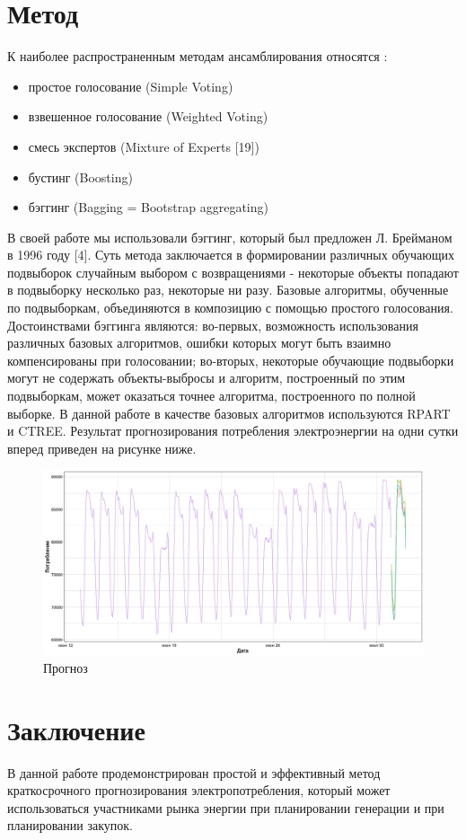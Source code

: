 \documentclass[60x84/16,8pt]{ittmm}
\begin{document}
\section{Метод}
\label{sec:methods}
К наиболее распространенным методам ансамблирования относятся \cite{Tihonov2006}:
\begin{itemize}
    \item простое голосование (Simple Voting)
    \item взвешенное голосование (Weighted Voting)
    \item смесь экспертов (Mixture of Experts [19])
    \item бустинг (Boosting)
    \item бэггинг (Bagging = Bootstrap aggregating)
\end{itemize}
В своей работе мы использовали бэггинг, который был предложен Л. Брейманом в
1996 году [4]. Суть метода заключается в формировании различных обучающих
подвыборок случайным выбором с возвращениями - некоторые объекты попадают в
подвыборку несколько раз, некоторые ни разу. Базовые алгоритмы, обученные по
подвыборкам, объединяются в композицию с помощью простого голосования.
Достоинствами бэггинга являются: во-первых, возможность использования различных
базовых алгоритмов, ошибки которых могут быть взаимно компенсированы при
голосовании; во-вторых, некоторые обучающие подвыборки могут не содержать
объекты-выбросы и алгоритм, построенный по этим подвыборкам, может оказаться
точнее алгоритма, построенного по полной выборке. В данной работе в качестве
базовых алгоритмов используются RPART и CTREE. Результат прогнозирования
потребления электроэнергии на одни сутки вперед приведен на рисунке ниже.
\begin{figure}
  \centering
  \includegraphics[width=0.8\linewidth]{Ru/prediction.jpeg}
  \caption{Прогноз}
  \label{fig:prediction}
\end{figure}


\section{Заключение}
В данной работе продемонстрирован простой и эффективный метод краткосрочного
прогнозирования электропотребления, который может использоваться участниками
рынка энергии при планировании генерации и при планировании закупок.
\end{document}
